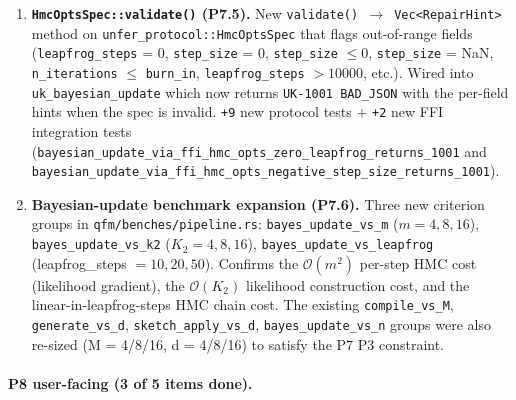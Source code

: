 \documentclass[11pt, a4paper]{article}
\begin{document}
\begin{enumerate}
\item \textbf{\texttt{HmcOptsSpec::validate()} (P7.5).} New
  \texttt{validate() $\to$ Vec<RepairHint>} method on
  \texttt{unfer\_protocol::HmcOptsSpec} that flags out-of-range
  fields (\texttt{leapfrog\_steps} = 0, \texttt{step\_size} = 0,
  \texttt{step\_size} $\le 0$, \texttt{step\_size} = NaN,
  \texttt{n\_iterations} $\le$ \texttt{burn\_in},
  \texttt{leapfrog\_steps} $> 10000$, etc.). Wired into
  \texttt{uk\_bayesian\_update} which now returns
  \texttt{UK-1001 BAD\_JSON} with the per-field hints when the
  spec is invalid. \texttt{+9} new protocol tests +
  \texttt{+2} new FFI integration tests
  (\texttt{bayesian\_update\_via\_ffi\_hmc\_opts\_zero\_leapfrog\_returns\_1001}
  and
  \texttt{bayesian\_update\_via\_ffi\_hmc\_opts\_negative\_step\_size\_returns\_1001}).

\item \textbf{Bayesian-update benchmark expansion (P7.6).} Three
  new criterion groups in \texttt{qfm/benches/pipeline.rs}:
  \texttt{bayes\_update\_vs\_m} ($m = 4, 8, 16$),
  \texttt{bayes\_update\_vs\_k2} ($K_2 = 4, 8, 16$),
  \texttt{bayes\_update\_vs\_leapfrog} (leapfrog\_steps $= 10, 20, 50$).
  Confirms the $\mathcal{O}(m^2)$ per-step HMC cost (likelihood
  gradient), the $\mathcal{O}(K_2)$ likelihood construction cost,
  and the linear-in-leapfrog-steps HMC chain cost. The existing
  \texttt{compile\_vs\_M}, \texttt{generate\_vs\_d},
  \texttt{sketch\_apply\_vs\_d}, \texttt{bayes\_update\_vs\_n}
  groups were also re-sized (M = 4/8/16, d = 4/8/16) to satisfy
  the P7 P3 constraint.
\end{enumerate}

\paragraph{P8 user-facing (3 of 5 items done).}
\end{document}
